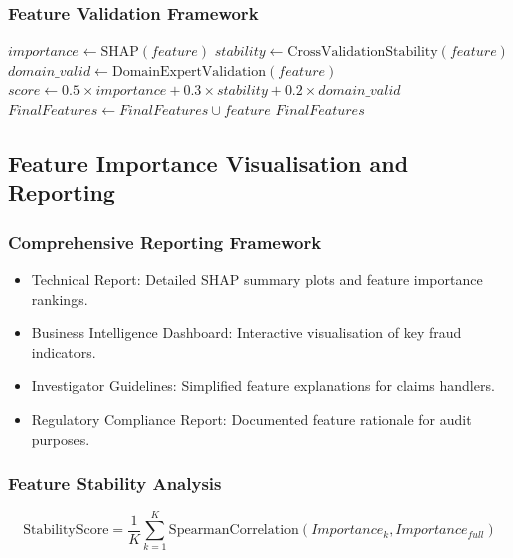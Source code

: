 \documentclass[12pt,a4paper,oneside]{report}
\numberwithin{equation}{chapter}
\begin{document}
\subsubsection{Feature Validation Framework}

\begin{algorithm}[H]
\caption{Feature Validation and Selection}
\label{alg:feature-validation}
\begin{algorithmic}[1]
    \State $importance \gets \text{SHAP}(feature)$
    \State $stability \gets \text{CrossValidationStability}(feature)$
    \State $domain\_valid \gets \text{DomainExpertValidation}(feature)$
    \State $score \gets 0.5 \times importance + 0.3 \times stability + 0.2 \times domain\_valid$
        \State $FinalFeatures \gets FinalFeatures \cup feature$
    \EndIf
\EndFor
\State \Return $FinalFeatures$
\EndProcedure
\end{algorithmic}
\end{algorithm}

\subsection{Feature Importance Visualisation and Reporting}
\label{subsec:feature-visualization}

\subsubsection{Comprehensive Reporting Framework}

\begin{itemize}
    \item Technical Report: Detailed SHAP summary plots and feature importance rankings.
    \item Business Intelligence Dashboard: Interactive visualisation of key fraud indicators.
    \item Investigator Guidelines: Simplified feature explanations for claims handlers.
    \item Regulatory Compliance Report: Documented feature rationale for audit purposes.
\end{itemize}

\subsubsection{Feature Stability Analysis}

\begin{equation}
\text{StabilityScore} = \frac{1}{K} \sum_{k=1}^{K} \text{SpearmanCorrelation}(Importance_k, Importance_{full})
\end{equation}
\end{document}
